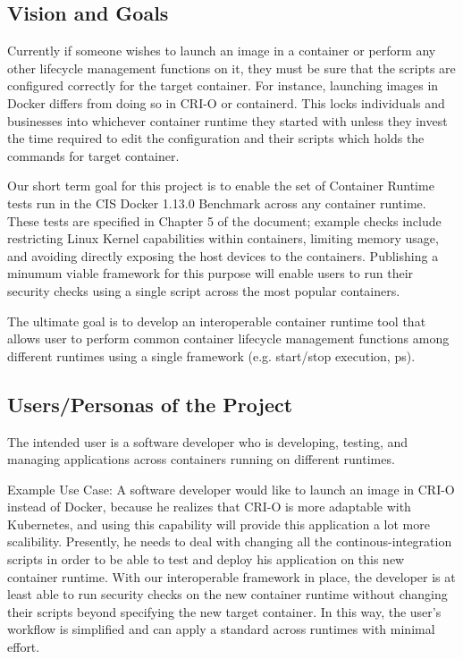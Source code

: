 \subsection{Vision and Goals}
Currently if someone wishes to launch an image in a container or perform any other lifecycle management functions on it, they must be sure that the scripts are configured correctly for the target container. For instance, launching images in Docker differs from doing so in CRI-O or containerd. This locks individuals and businesses into whichever container runtime they started with unless they invest the time required to edit the configuration and their scripts which holds the commands for target container.

Our short term goal for this project is to enable the set of Container Runtime tests run in the CIS Docker 1.13.0 Benchmark across any container runtime. These tests are specified in Chapter 5 of the document; example checks include restricting Linux Kernel capabilities within containers, limiting memory usage, and avoiding directly exposing the host devices to the containers. Publishing a minumum viable framework for this purpose will enable users to run their security checks using a single script across the most popular containers.

The ultimate goal is to develop an interoperable container runtime tool that allows user to perform common container lifecycle management functions among different runtimes using a single framework (e.g. start/stop execution, ps).

\subsection*{Users/Personas of the Project}
The intended user is a software developer who is developing, testing, and managing applications across containers running on different runtimes.

Example Use Case: A software developer would like to launch an image in CRI-O instead of Docker, because he realizes that CRI-O is more adaptable with Kubernetes, and using this capability will provide this application a lot more scalibility. Presently, he needs to deal with changing all the continous-integration scripts in order to be able to test and deploy his application on this new container runtime. With our interoperable framework in place, the developer is at least able to run security checks on the new container runtime without changing their scripts beyond specifying the new target container. In this way, the user's workflow is simplified and can apply a standard across runtimes with minimal effort.


